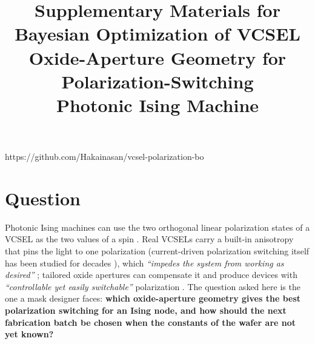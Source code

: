 \documentclass[10pt]{article}
\title{Supplementary Materials for Bayesian Optimization of VCSEL Oxide-Aperture Geometry for Polarization-Switching \\Photonic Ising Machine\\}
\date{}
\begin{document}
\maketitle
\vspace{-4em}
\begin{center}
    https://github.com/Hakainasan/vcsel-polarization-bo
\end{center}
\vspace{-1em}
\section{Question}
Photonic Ising machines can use the two orthogonal linear polarization states of a VCSEL as the two values of a spin \cite{mohseni2022,chen2026meta,yuan2025apl127}.
Real VCSELs carry a built-in anisotropy that pins the light to one polarization (current-driven polarization switching itself has been studied for decades \cite{choquette1995,willemsen2000}), which \emph{``impedes the system from working as desired''} \cite{chen2026meta};
tailored oxide apertures can compensate it and produce devices with \emph{``controllable yet easily switchable''} polarization \cite{yuan2025jlt}.
The question asked here is the one a mask designer faces: \textbf{which oxide-aperture geometry gives the best polarization switching for an Ising node, and how should the next fabrication batch be chosen when the constants of the wafer are not yet known?}
\end{document}
